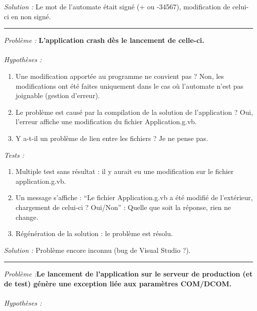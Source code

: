 \documentclass[a4paper,12pt]{extarticle}
\begin{document}
\emph{Solution :} Le mot de l’automate était signé (+ ou -34567), modification de celui-ci en non signé.
\begin{center}
	\rule{8cm}{0.1pt}
\end{center}

\emph{Problème :} \textbf{L’application crash dès le lancement de celle-ci.}\\
\\
\emph{Hypothèses :}

\begin{enumerate}[-]
    \item Une modification apportée au programme ne convient pas ? Non, les modifications ont été faites uniquement dans le cas où l'automate n'est pas joignable (gestion d’erreur).
	\item Le problème est causé par la compilation de la solution de l’application ? Oui, l'erreur affiche une modification du fichier Application.g.vb.
	\item Y a-t-il un problème de lien entre les fichiers ? Je ne pense pas.
\end{enumerate}

\emph{Tests :}

\begin{enumerate}[-]
    \item Multiple test sans résultat : il y aurait eu une modification sur le fichier application.g.vb.
	\item Un message s’affiche : “Le fichier Application.g.vb a été modifié de l'extérieur, chargement de celui-ci ? Oui/Non” : Quelle que soit la réponse, rien ne change.
	\item Régénération de la solution : le problème est résolu.
\end{enumerate}

\emph{Solution :} Problème encore inconnu (bug de Visual Studio ?).
\begin{center}
	\rule{8cm}{0.1pt}
\end{center}

\emph{Problème :}\textbf{Le lancement de l’application sur le serveur de production (et de test) génère une exception liée aux paramètres COM/DCOM.}\\
\\
\emph{Hypothèses :}
\end{document}
